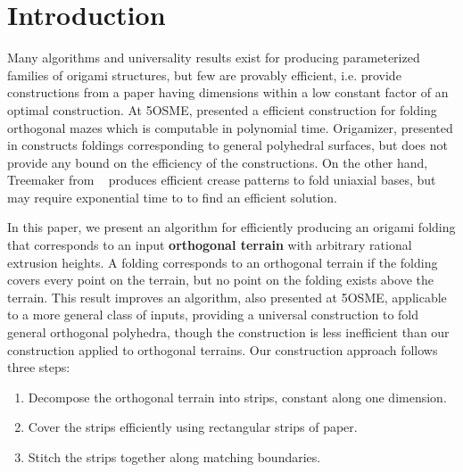 \section{Introduction}
\label{sec:introduction}

Many algorithms and universality results exist for producing parameterized
families of origami structures, but few are provably efficient, i.e. provide
constructions from a paper having dimensions within a low constant factor of an
optimal construction. At 5OSME, \cite{MazeFolding_Origami5} presented a
efficient construction for folding orthogonal mazes which is computable in
polynomial time. Origamizer, presented in \cite{Origamizer_SoCG2017} constructs
foldings corresponding to general polyhedral surfaces, but does not provide any
bound on the efficiency of the constructions. On the other hand, Treemaker from
~\cite{Lang} produces efficient crease patterns to fold uniaxial bases, but may
require exponential time to to find an efficient solution. 

In this paper, we present an algorithm for efficiently producing an origami
folding that corresponds to an input {\bf orthogonal terrain} with arbitrary
rational extrusion heights. A folding corresponds to an orthogonal terrain if
the folding covers every point on the terrain, but no point on the folding
exists above the terrain. This result improves an algorithm,
\cite{BoxPleating_Origami5} also presented at 5OSME, applicable to a more
general class of inputs, providing a universal construction to fold general
orthogonal polyhedra, though the construction is less inefficient than our
construction applied to orthogonal terrains. Our construction approach follows
three steps: 

\vspace{-0.2pc} 
\begin{enumerate} 
\item Decompose the orthogonal terrain into strips, constant along one dimension.
\item Cover the strips efficiently using rectangular strips of paper.
\item Stitch the strips together along matching boundaries.
\end{enumerate}
\vspace{-0.2pc}

